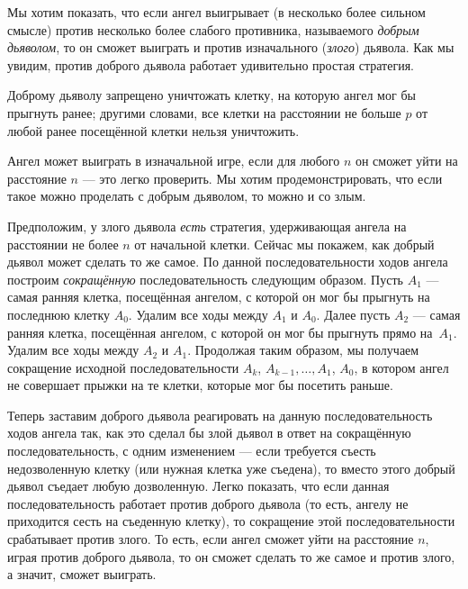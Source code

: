 Мы хотим показать, что если ангел выигрывает (в несколько более сильном смысле) против несколько более слабого противника, называемого \emph{добрым дьяволом}, то он сможет выиграть и против изначального (\emph{злого}) дьявола.
Как мы увидим, против доброго дьявола работает удивительно простая стратегия.

Доброму дьяволу запрещено уничтожать клетку, на которую ангел мог бы прыгнуть ранее;
другими словами, все клетки на расстоянии не больше $p$ от любой ранее посещённой клетки нельзя уничтожить.

Ангел может выиграть в изначальной игре, если для любого $n$ он сможет уйти на расстояние $n$ --- это легко проверить.
Мы хотим продемонстрировать, что если такое можно проделать с добрым дьяволом, то можно и со злым.

Предположим, у злого дьявола \emph{есть} стратегия, удерживающая ангела на расстоянии не более $n$ от начальной клетки.
Сейчас мы покажем, как добрый дьявол может сделать то же самое.
По данной последовательности ходов ангела построим \emph{сокращённую} последовательность следующим образом.
Пусть $A_1$ --- самая ранняя клетка, посещённая ангелом, с которой он мог бы прыгнуть на последнюю клетку $A_0$.
Удалим все ходы между $A_1$ и $A_0$.
Далее пусть $A_2$ --- самая ранняя клетка, посещённая ангелом, с которой он мог бы прыгнуть прямо на~$A_1$.
Удалим все ходы между $A_2$ и $A_1$.
Продолжая таким образом, мы получаем сокращение исходной последовательности $A_k$, $A_{k-1}, \dots, A_1$, $A_0$, в котором ангел не совершает прыжки на те клетки, которые мог бы посетить раньше.

Теперь заставим доброго дьявола реагировать на данную последовательность ходов ангела так, как это сделал бы злой дьявол в ответ на сокращённую последовательность, с одним изменением --- если требуется съесть недозволенную клетку (или нужная клетка уже съедена), то вместо этого добрый дьявол съедает любую дозволенную.
Легко показать, что если данная последовательность работает против доброго дьявола (то есть, ангелу не приходится сесть на съеденную клетку), то сокращение этой последовательности срабатывает против злого.
То есть, если ангел сможет уйти на расстояние $n$, играя против доброго дьявола, то он сможет сделать то же самое и против злого, а значит, сможет выиграть.

